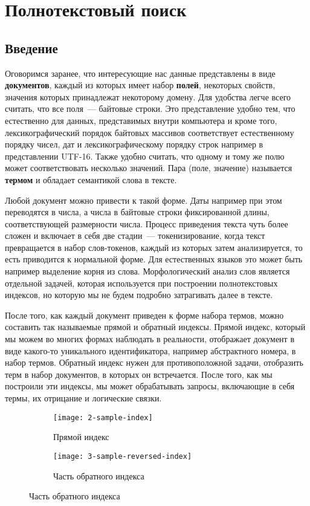 \section{Полнотекстовый поиск}

\subsection{Введение}

Оговоримся заранее, что интересующие нас данные представлены в виде \textbf{документов}, каждый из которых имеет набор \textbf{полей}, некоторых свойств, значения которых принадлежат некоторому домену. Для удобства легче всего считать, что все поля~--- байтовые строки. Это представление удобно тем, что естественно для данных, представимых внутри компьютера и кроме того, лексикографический порядок байтовых массивов соответствует естественному порядку чисел, дат и лексикографическому порядку строк например в представлении UTF-16. Также удобно считать, что одному и тому же полю может соответствовать несколько значений. Пара (поле, значение) называется \textbf{термом} и обладает семантикой слова в тексте.

Любой документ можно привести к такой форме. Даты например при этом переводятся в числа, а числа в байтовые строки фиксированной длины, соответствующей размерности числа. Процесс приведения текста чуть более сложен и включает в себя две стадии~--- токенизирование, когда текст превращается в набор слов-токенов, каждый из которых затем анализируется, то есть приводится к нормальной форме. Для естественных языков это может быть например выделение корня из слова. Морфологический анализ слов является отдельной задачей, которая используется при построении полнотекстовых индексов, но которую мы не будем подробно затрагивать далее в тексте.

После того, как каждый документ приведен к форме набора термов, можно составить так называемые прямой и обратный индексы. Прямой индекс, который мы можем во многих формах наблюдать в реальности, отображает документ в виде какого-то уникального идентификатора, например абстрактного номера, в набор термов. Обратный индекс нужен для противоположной задачи, отобразить терм в набор документов, в которых он встречается. После того, как мы построили эти индексы, мы может обрабатывать запросы, включающие в себя термы, их отрицание и логические связки.

\begin{figure}[h]
	\centering
	\caption{Пример прямого и обратного индексов}
	
	\begin{subfigure}[b]{0.7\linewidth}
		\texttt{[image: 2-sample-index]}
		\caption{Прямой индекс}
	\end{subfigure}
	
	\begin{subfigure}[b]{0.7\linewidth}
		\texttt{[image: 3-sample-reversed-index]}
		\caption{Часть обратного индекса}
	\end{subfigure}
\end{figure}

